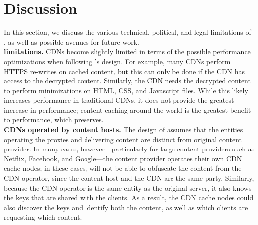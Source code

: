 \section{Discussion}
\label{sec:discussion}
In this section, we discuss the various technical, political, and legal limitations
of \system{}, as well as possible avenues for future work. \\
\vspace{0pt}
\textbf{\system{} limitations.} CDNs become slightly limited in terms of the 
possible performance optimizations when following \system{}'s design.  For example, 
many CDNs perform HTTPS re-writes on cached content, but this can only be 
done if the CDN has access to the decrypted content.  Similarly, the CDN needs the 
decrypted content to perform minimizations on HTML, CSS, and Javascript files.  While 
this likely increases performance in traditional CDNs, it does not provide the greatest 
increase in performance; content caching around the world is the greatest benefit to 
performance, which \system{} preserves.\\
\vspace{0pt}
\textbf{CDNs operated by content hosts.} The design of \system{}
assumes that the entities operating the proxies and delivering content are
distinct from original content provider. In many cases, however---particularly
for large content providers such as Netflix, Facebook, and Google---the
content provider operates their own CDN cache nodes; in these cases, \system{} will
not be able to obfuscate the content from the CDN operator, since the content host
and the CDN are the same party.  Similarly, because the CDN operator is the same
entity as the original server, it also knows the keys that are shared with the clients.
As a result, the CDN cache nodes could also discover the keys and identify both
the content, as well as which clients are requesting which content.\\
\vspace{0pt}

